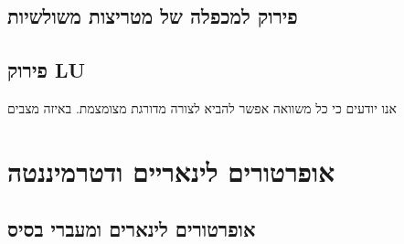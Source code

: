 \documentclass{tstextbook}
\begin{document}
\subsection{פירוק למכפלה של מטריצות משולשיות}

\subsection{פירוק LU}

אנו יודעים כי כל משוואה אפשר להביא לצורה מדורגת מצומצמת. באיזה מצבים 

\section{אופרטורים לינאריים ודטרמיננטה}

\subsection{אופרטורים לינארים ומעברי בסיס}
\end{document}
